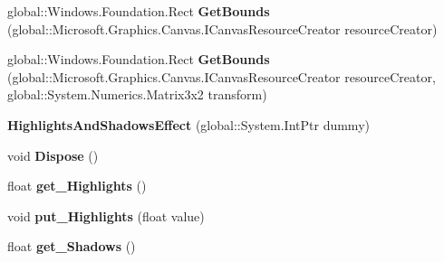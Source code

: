 \begin{DoxyCompactItemize}
global\+::\+Windows.\+Foundation.\+Rect {\bfseries Get\+Bounds} (global\+::\+Microsoft.\+Graphics.\+Canvas.\+I\+Canvas\+Resource\+Creator resource\+Creator)
\item 
\mbox{\label{class_microsoft_1_1_graphics_1_1_canvas_1_1_effects_1_1_highlights_and_shadows_effect_a52c38c5ad7bad6373c8a4bfa4c833cdf}} 
global\+::\+Windows.\+Foundation.\+Rect {\bfseries Get\+Bounds} (global\+::\+Microsoft.\+Graphics.\+Canvas.\+I\+Canvas\+Resource\+Creator resource\+Creator, global\+::\+System.\+Numerics.\+Matrix3x2 transform)
\item 
\mbox{\label{class_microsoft_1_1_graphics_1_1_canvas_1_1_effects_1_1_highlights_and_shadows_effect_a49c24ba8cbbe709553a047ed0a174cd5}} 
{\bfseries Highlights\+And\+Shadows\+Effect} (global\+::\+System.\+Int\+Ptr dummy)
\item 
\mbox{\label{class_microsoft_1_1_graphics_1_1_canvas_1_1_effects_1_1_highlights_and_shadows_effect_a46bf03f4381128bc91a8897ab8420b8e}} 
void {\bfseries Dispose} ()
\item 
\mbox{\label{class_microsoft_1_1_graphics_1_1_canvas_1_1_effects_1_1_highlights_and_shadows_effect_ad3f72cfd6e6d3034e5bfe3baa01927c1}} 
float {\bfseries get\+\_\+\+Highlights} ()
\item 
\mbox{\label{class_microsoft_1_1_graphics_1_1_canvas_1_1_effects_1_1_highlights_and_shadows_effect_a3be5bf341f60d60d01dde1546fb07565}} 
void {\bfseries put\+\_\+\+Highlights} (float value)
\item 
\mbox{\label{class_microsoft_1_1_graphics_1_1_canvas_1_1_effects_1_1_highlights_and_shadows_effect_a9f62693f3bc1030624ce81336333d4e3}} 
float {\bfseries get\+\_\+\+Shadows} ()
\item 
\mbox{\label{class_microsoft_1_1_graphics_1_1_canvas_1_1_effects_1_1_highlights_and_shadows_effect_a965bd7d4f4dd2b74faec26e71917af63}} 

\end{DoxyCompactItemize}
